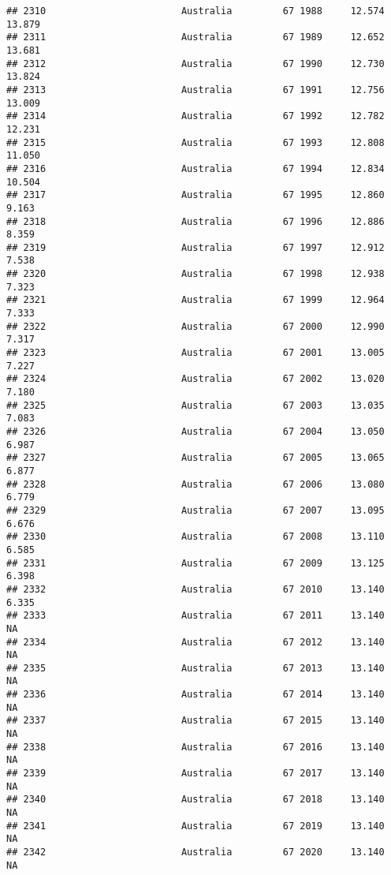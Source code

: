 \documentclass[
]{article}
\begin{document}
\begin{verbatim}
## 2310                        Australia         67 1988     12.574     13.879
## 2311                        Australia         67 1989     12.652     13.681
## 2312                        Australia         67 1990     12.730     13.824
## 2313                        Australia         67 1991     12.756     13.009
## 2314                        Australia         67 1992     12.782     12.231
## 2315                        Australia         67 1993     12.808     11.050
## 2316                        Australia         67 1994     12.834     10.504
## 2317                        Australia         67 1995     12.860      9.163
## 2318                        Australia         67 1996     12.886      8.359
## 2319                        Australia         67 1997     12.912      7.538
## 2320                        Australia         67 1998     12.938      7.323
## 2321                        Australia         67 1999     12.964      7.333
## 2322                        Australia         67 2000     12.990      7.317
## 2323                        Australia         67 2001     13.005      7.227
## 2324                        Australia         67 2002     13.020      7.180
## 2325                        Australia         67 2003     13.035      7.083
## 2326                        Australia         67 2004     13.050      6.987
## 2327                        Australia         67 2005     13.065      6.877
## 2328                        Australia         67 2006     13.080      6.779
## 2329                        Australia         67 2007     13.095      6.676
## 2330                        Australia         67 2008     13.110      6.585
## 2331                        Australia         67 2009     13.125      6.398
## 2332                        Australia         67 2010     13.140      6.335
## 2333                        Australia         67 2011     13.140         NA
## 2334                        Australia         67 2012     13.140         NA
## 2335                        Australia         67 2013     13.140         NA
## 2336                        Australia         67 2014     13.140         NA
## 2337                        Australia         67 2015     13.140         NA
## 2338                        Australia         67 2016     13.140         NA
## 2339                        Australia         67 2017     13.140         NA
## 2340                        Australia         67 2018     13.140         NA
## 2341                        Australia         67 2019     13.140         NA
## 2342                        Australia         67 2020     13.140         NA

\end{verbatim}
\end{document}
